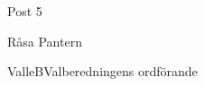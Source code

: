 \documentclass{dsekelectionproposal}
\begin{document}
\begin{vemsection}
    \begin{vemlist}{Post 5}
        \item Råsa Pantern
    \end{vemlist}

\end{vemsection}

\signature{För Valberedningen, dag som ovan}{ValleB}{Valberedningens ordförande}

\begin{statistikpage}


\end{statistikpage}

\end{document}

